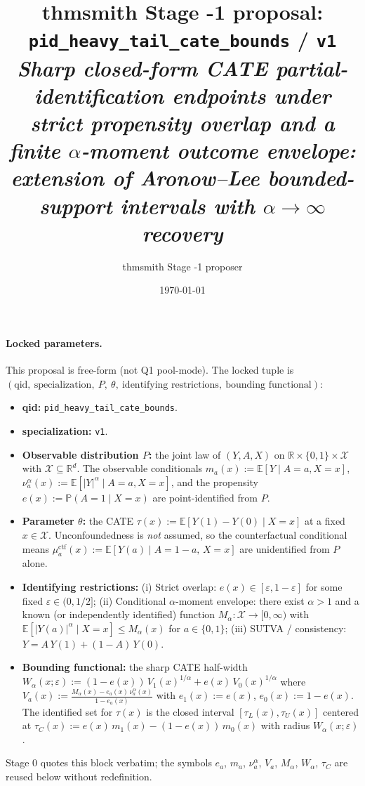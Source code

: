\documentclass[11pt]{article}
\title{thmsmith Stage -1 proposal: \texttt{pid\_heavy\_tail\_cate\_bounds} / \texttt{v1}%
  \\ \large\textit{Sharp closed-form CATE partial-identification endpoints under strict
  propensity overlap and a finite $\alpha$-moment outcome envelope: extension of
  Aronow--Lee bounded-support intervals with $\alpha\!\to\!\infty$ recovery}}
\author{thmsmith Stage -1 proposer}
\date{\today}
\newcommand{\E}{\mathbb{E}}
\renewcommand{\Pr}{\mathbb{P}}
\newcommand{\R}{\mathbb{R}}
\theoremstyle{definition}
\theoremstyle{plain}
\theoremstyle{remark}
\begin{document}
\maketitle


\paragraph{Locked parameters.}
This proposal is free-form (not Q1 pool-mode). The locked tuple is
$(\text{qid},\ \text{specialization},\ P,\ \theta,\ \text{identifying restrictions},\ \text{bounding functional})$:
\begin{itemize}[leftmargin=2em]
  \item \textbf{qid:} \texttt{pid\_heavy\_tail\_cate\_bounds}.
  \item \textbf{specialization:} \texttt{v1}.
  \item \textbf{Observable distribution $P$:} the joint law of $(Y, A, X)$ on
        $\R \times \{0,1\} \times \mathcal{X}$ with $\mathcal{X} \subseteq \R^d$.
        The observable conditionals
        $m_a(x) := \E[Y\mid A=a, X=x]$,
        $\nu_a^\alpha(x) := \E[|Y|^\alpha \mid A=a, X=x]$,
        and the propensity $e(x) := \Pr(A=1\mid X=x)$ are point-identified from $P$.
  \item \textbf{Parameter $\theta$:} the CATE
        $\tau(x) := \E[Y(1) - Y(0) \mid X=x]$ at a fixed $x \in \mathcal{X}$.
        Unconfoundedness is \emph{not} assumed, so the counterfactual conditional means
        $\mu_a^{\mathrm{ctf}}(x) := \E[Y(a) \mid A = 1{-}a,\, X=x]$ are unidentified from $P$ alone.
  \item \textbf{Identifying restrictions:}
        (i) Strict overlap: $e(x) \in [\varepsilon, 1-\varepsilon]$ for some fixed
        $\varepsilon \in (0, 1/2]$;
        (ii) Conditional $\alpha$-moment envelope: there exist $\alpha > 1$ and a known (or independently identified) function $M_\alpha:\mathcal{X}\to[0,\infty)$ with $\E[|Y(a)|^\alpha \mid X=x] \le M_\alpha(x)$ for $a\in\{0,1\}$;
        (iii) SUTVA / consistency: $Y = A\,Y(1) + (1{-}A)\,Y(0)$.
  \item \textbf{Bounding functional:}
        the sharp CATE half-width
        $W_\alpha(x;\varepsilon) := (1-e(x))\,V_1(x)^{1/\alpha} + e(x)\,V_0(x)^{1/\alpha}$
        where $V_a(x) := \frac{M_\alpha(x) - e_a(x)\,\nu_a^\alpha(x)}{1 - e_a(x)}$
        with $e_1(x):=e(x)$, $e_0(x):=1-e(x)$.
        The identified set for $\tau(x)$ is the closed interval
        $[\tau_L(x), \tau_U(x)]$ centered at
        $\tau_C(x) := e(x)\,m_1(x) - (1-e(x))\,m_0(x)$ with radius $W_\alpha(x;\varepsilon)$.
\end{itemize}
Stage 0 quotes this block verbatim; the symbols $e_a$, $m_a$, $\nu_a^\alpha$, $V_a$, $M_\alpha$, $W_\alpha$, $\tau_C$ are reused below without redefinition.
\end{document}
